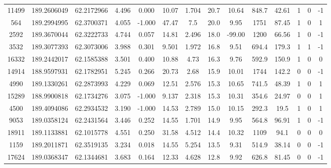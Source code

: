 \begin{table*}
\begin{center}
\begin{tabular}{ cccccccccccccc }
       11499 & 189.2606049 &  62.2172966 &  4.496 &  0.000 &     10.07 &     1.704 &    20.7 &   10.64 &     848.7 &     42.61 &      1 &      0 &       -1 \\ 
         564 & 189.2994995 &  62.3700371 &  4.055 & -1.000 &     47.47 &       7.5 &    20.0 &    9.95 &      1751 &     87.45 &      1 &      0 &        1 \\ 
        2592 & 189.3670044 &  62.3222733 &  4.744 &  0.057 &     14.81 &     2.496 &    18.0 &  -99.00 &      1200 &     66.56 &      1 &      0 &       -1 \\ 
        3532 & 189.3077393 &  62.3073006 &  3.988 &  0.301 &     9.501 &     1.972 &    16.8 &    9.51 &     694.4 &     179.3 &      1 &      1 &       -1 \\ 
       16332 & 189.2442017 &  62.1585388 &  3.501 &  0.400 &     10.88 &      4.73 &    16.3 &    9.76 &     592.9 &     150.9 &      1 &      0 &        0 \\ 
       14914 & 188.9597931 &  62.1782951 &  5.245 &  0.266 &     20.73 &      2.68 &    15.9 &   10.01 &      1744 &     142.2 &      0 &      0 &       -1 \\ 
        4990 & 189.1330261 &  62.2873993 &  4.229 &  0.069 &     12.51 &     2.576 &    15.3 &   10.65 &     741.5 &     48.39 &      1 &      0 &        1 \\ 
       15289 & 188.9900818 &  62.1734276 &  3.075 & -1.000 &     9.137 &     2.318 &    15.3 &   10.31 &     354.6 &     24.97 &      0 &      0 &        1 \\ 
        4500 & 189.4094086 &  62.2934532 &  3.190 & -1.000 &     14.53 &     2.789 &    15.0 &   10.15 &     292.3 &      19.5 &      1 &      0 &        1 \\ 
        9053 & 189.0358124 &  62.2431564 &  3.446 &  0.252 &     14.55 &     1.701 &    14.9 &    9.95 &     564.8 &     96.91 &      1 &      0 &       -1 \\ 
       18911 & 189.1133881 &  62.1015778 &  4.551 &  0.250 &     31.58 &     4.512 &    14.4 &   10.32 &      1109 &      94.1 &      0 &      0 &        0 \\ 
        1159 & 189.2011871 &  62.3519135 &  3.234 &  0.018 &     14.55 &     5.254 &    13.5 &    9.31 &     514.9 &     38.14 &      0 &      0 &       -1 \\ 
       17624 & 189.0368347 &  62.1344681 &  3.683 &  0.164 &     12.33 &     4.628 &    12.8 &    9.92 &     626.8 &     81.45 &      0 &      0 &       -1 \\ 

\end{tabular}
\end{center}
\end{table*}
